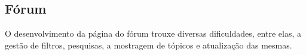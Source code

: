 \subsection{Fórum}
O desenvolvimento da página do fórum trouxe diversas dificuldades, entre elas, a gestão de filtros, pesquisas, a mostragem de tópicos e atualização das mesmas.

\vspace{10mm}
\begin{figure}[htb]%
 \centering
 \qquad
 \label{fig:72}%
\end{figure}
\vspace{10mm}

\newpage

